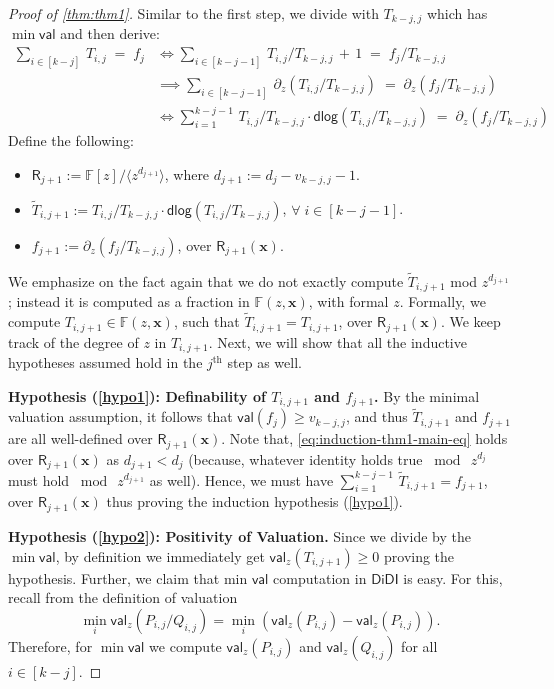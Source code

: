 \documentclass[10pt,a4paper]{article}
\newcommand{\DiDI}{\mathsf{DiDI}}
\newcommand{\F}{\mathbb{F}}
\newcommand{\ringR}{\mathsf{R}}
\newcommand{\x}{{\boldsymbol x}}
\newcommand{\val}{\mathsf{val}}
\newcommand{\dlg}{\mathsf{dlog}}
\numberwithin{equation}{section}
\begin{document}
\begin{proof}[Proof of \autoref{thm:thm1}]
Similar to the first step, we divide with $T_{k-j,j}$ which has $\min \val$ and then derive:
\begin{align}
    \sum_{i \in [k-j]}\,T_{i,j} \;=\; f_j  &\iff  \sum_{i \in [k-j-1]}\,T_{i,j}/T_{k-j,j} \,+\, 1 \;=\; f_j/T_{k-j,j} \nonumber\\  &\implies \sum_{i \in [k-j-1]}\,\partial_{z} (T_{i,j}/T_{k-j,j}) \;=\; \partial_{z}(f_j/T_{k-j,j})\nonumber \\ &\iff \sum_{i=1}^{k-j-1}\,T_{i,j}/T_{k-j,j} \cdot \dlg (T_{i,j}/T_{k-j,j}) \;=\; \partial_{z} (f_j/T_{k-j,j}) \label{eq:induction-thm1-main-eq}
\end{align}
Define the following:
\begin{itemize}
    \setlength\itemsep{1em}
    \item $\ringR_{j+1}:= \F[z]/ \langle z^{d_{j+1}} \rangle$, where $d_{j+1}:=d_j-v_{k-j,j}-1$. 
    \item $\widetilde{T}_{i,j+1} := T_{i,j}/T_{k-j,j} \cdot \dlg(T_{i,j}/T_{k-j,j})$, $\forall\;i \in [k-j-1]$.
    \item $f_{j+1}:=\partial_{z}(f_j/T_{k-j,j})$, over $\ringR_{j+1}(\x)$.
\end{itemize}

We emphasize on the fact again that we do not exactly compute $\widetilde{T}_{i,j+1}$ mod $z^{d_{j+1}}$; instead it is computed as a fraction in $\F(z,\x)$, with formal $z$. Formally, we compute $T_{i,j+1} \in \F(z,\x)$, such that $\widetilde{T}_{i,j+1} = T_{i,j+1}$, over $\ringR_{j+1}(\x)$. We keep track of the degree of $z$ in $T_{i,j+1}$. Next, we will show that all the inductive hypotheses assumed hold in the $j^{\text{th}}$ step as well. 

\smallskip

\noindent \textbf{Hypothesis (\ref{hypo1}): Definability of $T_{i,j+1}$ and $f_{j+1}$.} By the minimal valuation assumption, it follows that $\val(f_j) \ge v_{k-j,j}$, and thus $\widetilde{T}_{i,j+1}$ and $f_{j+1}$ are all well-defined over $\ringR_{j+1}(\x)$. Note that, \autoref{eq:induction-thm1-main-eq} holds over $\ringR_{j+1}(\x)$ as $d_{j+1} < d_j$ (because, whatever identity holds true $\bmod \ z^{d_j}$ must hold $\bmod \ z^{d_{j+1}}$ as well). Hence, we must have $\sum_{i=1}^{k-j-1}\, \widetilde{T}_{i,j+1} = f_{j+1}$, over $\ringR_{j+1}(\x)$ thus proving the induction hypothesis (\ref{hypo1}). 
 
%

\smallskip

\noindent \textbf{Hypothesis (\ref{hypo2}): Positivity of Valuation.} Since we divide by the $\min \val$, by definition we immediately get $\val_{z}(T_{i,j+1}) \ge 0$ proving the hypothesis. Further, we claim that min $\val$ computation in $\DiDI$ is easy. For this, recall from the definition of valuation \[\min_{i}\val_{z}(P_{i,j}/Q_{i,j})= \min_{i} (\val_{z}(P_{i,j}) - \val_{z}(P_{i,j}) ). \] Therefore, for $\min \val$ we compute $\val_{z}(P_{i,j})$ and $\val_{z}(Q_{i,j})$ for all $i \in [k-j]$.


\end{proof}
\end{document}

